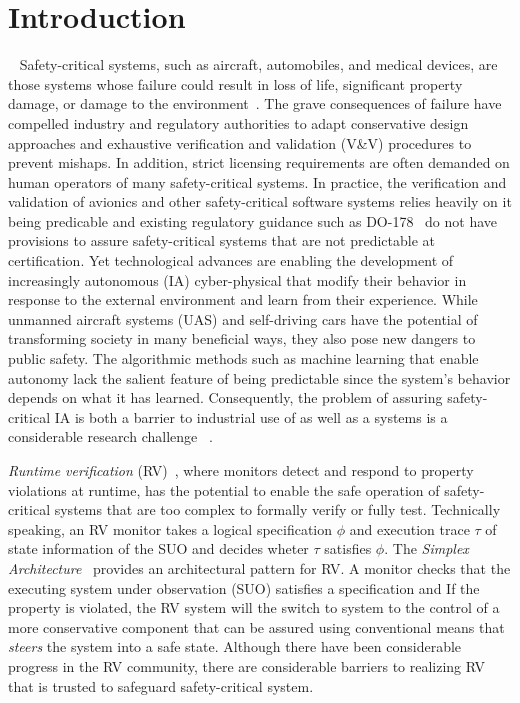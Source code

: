 \section{Introduction}~\label{sec:intro} 
Safety-critical systems, such as aircraft, automobiles, and medical
devices, are those systems whose failure could result
in loss of life, significant property damage, or damage to the
environment~\cite{Knight2002}.  The  grave consequences of failure have compelled
industry and regulatory authorities  to adapt conservative design
approaches and exhaustive verification and validation (V\&V) procedures
to prevent mishaps. In addition, strict licensing requirements are
often demanded on human operators of  many safety-critical systems.
In practice, the verification and validation of avionics
and other safety-critical software systems relies heavily on it being
predicable and existing regulatory guidance  such as
DO-178~\cite{DO178B}  do not  have provisions to
assure safety-critical systems that are not predictable at certification. 
Yet technological advances are enabling the development of increasingly
autonomous (IA) cyber-physical  that modify their behavior in response
to the external environment and learn from their experience.  While
unmanned aircraft systems (UAS) and self-driving cars have the
potential of transforming society in many beneficial ways, they also
pose new dangers to public safety. The algorithmic methods such as
machine learning that enable autonomy lack the salient feature of
being predictable since the system's behavior depends on what it has
learned.  Consequently, the  problem  of assuring safety-critical IA is
both a barrier to industrial use of  as well as a 
systems is a considerable research challenge~\cite{NRC14} .


\emph{Runtime verification} (RV)~\cite{monitors}, where monitors
detect and respond to property violations at runtime, has the
potential to enable the safe operation of safety-critical systems that
are too complex to formally verify or fully test.  Technically
speaking, an RV monitor takes a logical specification $\phi$ and
execution trace $\tau$ of state information of the SUO and decides
wheter $\tau$ satisfies $\phi$. The \emph{Simplex
  Architecture}~\cite{simplex} provides an architectural pattern for
RV. A monitor checks that the executing system under observation (SUO)
satisfies a specification and If the property is violated, the RV
system will the switch to system to the control of a more conservative
component that can be assured using conventional means that
\emph{steers} the system into a safe state. Although there have been
considerable progress in the RV community, there are considerable
barriers to realizing RV that is trusted to safeguard safety-critical
system.

